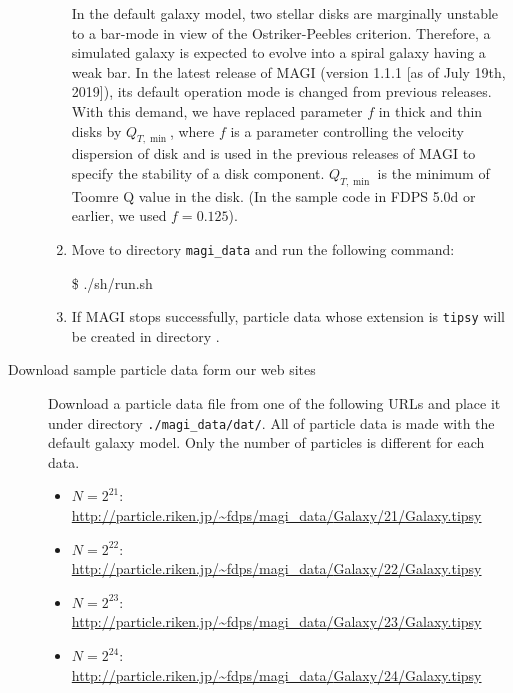 \begin{description}
\begin{enumerate}
\begin{enumerate}[label=(\roman*)]
\end{enumerate}
In the default galaxy model, two stellar disks are marginally unstable to a bar-mode in view of the Ostriker-Peebles criterion. Therefore, a simulated galaxy is expected to evolve into a spiral galaxy having a weak bar. In the latest release of \textsc{MAGI} (version 1.1.1 [as of July 19th, 2019]), its default operation mode is changed from previous releases. With this demand, we have replaced parameter $f$ in thick and thin disks by $Q_{T,\min}$, where $f$ is a parameter controlling the velocity dispersion of disk and is used in the previous releases of \textsc{MAGI} to specify the stability of a disk component. $Q_{T,\min}$ is the minimum of Toomre Q value in the disk. (In the sample code in FDPS 5.0d or earlier, we used $f=0.125$).
\item Move to directory \texttt{magi\_data} and run the following command:
\begin{screen}
\$ ./sh/run.sh
\end{screen}
\item If \textsc{MAGI} stops successfully, particle data whose extension is \texttt{tipsy} will be created in directory .
\end{enumerate}
\item[Download sample particle data form our web sites]  Download a particle data file from one of the following URLs and place it under directory \texttt{./magi\_data/dat/}. All of particle data is made with the default galaxy model. Only the number of particles is different for each data.
\begin{itemize}
\item $N=2^{21}$: \href{http://particle.riken.jp/~fdps/magi_data/Galaxy/21/Galaxy.tipsy}{http://particle.riken.jp{\slash}\~{}fdps{\slash}magi\_data{\slash}Galaxy{\slash}21{\slash}Galaxy.tipsy}
\item $N=2^{22}$: \href{http://particle.riken.jp/~fdps/magi_data/Galaxy/22/Galaxy.tipsy}{http://particle.riken.jp{\slash}\~{}fdps{\slash}magi\_data{\slash}Galaxy{\slash}22{\slash}Galaxy.tipsy}
\item $N=2^{23}$: \href{http://particle.riken.jp/~fdps/magi_data/Galaxy/23/Galaxy.tipsy}{http://particle.riken.jp{\slash}\~{}fdps{\slash}magi\_data{\slash}Galaxy{\slash}23{\slash}Galaxy.tipsy}
\item $N=2^{24}$: \href{http://particle.riken.jp/~fdps/magi_data/Galaxy/23/Galaxy.tipsy}{http://particle.riken.jp{\slash}\~{}fdps{\slash}magi\_data{\slash}Galaxy{\slash}24{\slash}Galaxy.tipsy}
\end{itemize}
\end{description}

